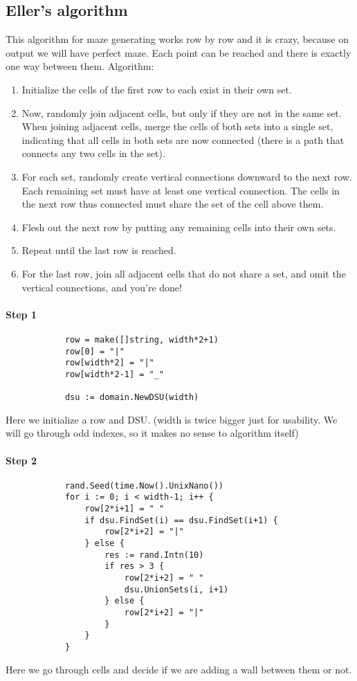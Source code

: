 		\subsection{Eller's algorithm}
		This algorithm for maze generating works row by row and it is crazy, because on output we will have perfect maze. Each point can be reached and there is exactly one way between them.
		Algorithm:
		
		\begin{enumerate}
			\item Initialize the cells of the first row to each exist in their own set.
			\item Now, randomly join adjacent cells, but only if they are not in the same set. When joining adjacent cells, merge the cells of both sets into a single set, indicating that all cells in both sets are now connected (there is a path that connects any two cells in the set).
			\item For each set, randomly create vertical connections downward to the next row. Each remaining set must have at least one vertical connection. The cells in the next row thus connected must share the set of the cell above them.
			\item Flesh out the next row by putting any remaining cells into their own sets.
			\item Repeat until the last row is reached.
			\item For the last row, join all adjacent cells that do not share a set, and omit the vertical connections, and you’re done!
		\end{enumerate}
		
		\paragraph{Step 1}
		
		\begin{lstlisting}
			row = make([]string, width*2+1)
			row[0] = "|"
			row[width*2] = "|"
			row[width*2-1] = "_"

			dsu := domain.NewDSU(width)
		\end{lstlisting}
		
		Here we initialize a row and DSU. (width is twice bigger just for usability. We will go through odd indexes, so it makes no sense to algorithm itself)
		
		\paragraph{Step 2}
		\begin{lstlisting}
			rand.Seed(time.Now().UnixNano())
			for i := 0; i < width-1; i++ {
				row[2*i+1] = " "
				if dsu.FindSet(i) == dsu.FindSet(i+1) {
					row[2*i+2] = "|"
				} else {
					res := rand.Intn(10)
					if res > 3 {
						row[2*i+2] = " "
						dsu.UnionSets(i, i+1)
					} else {
						row[2*i+2] = "|"
					}
				}
			}
		\end{lstlisting}
		Here we go through cells and decide if we are adding a wall between them or not.
		
